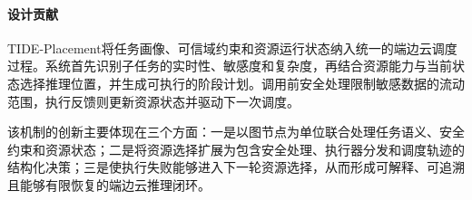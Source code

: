 
\paragraph{设计贡献}

TIDE-Placement将任务画像、可信域约束和资源运行状态纳入统一的端边云调度过程。系统首先识别子任务的实时性、敏感度和复杂度，再结合资源能力与当前状态选择推理位置，并生成可执行的阶段计划。调用前安全处理限制敏感数据的流动范围，执行反馈则更新资源状态并驱动下一次调度。

该机制的创新主要体现在三个方面：一是以图节点为单位联合处理任务语义、安全约束和资源状态；二是将资源选择扩展为包含安全处理、执行器分发和调度轨迹的结构化决策；三是使执行失败能够进入下一轮资源选择，从而形成可解释、可追溯且能够有限恢复的端边云推理闭环。



